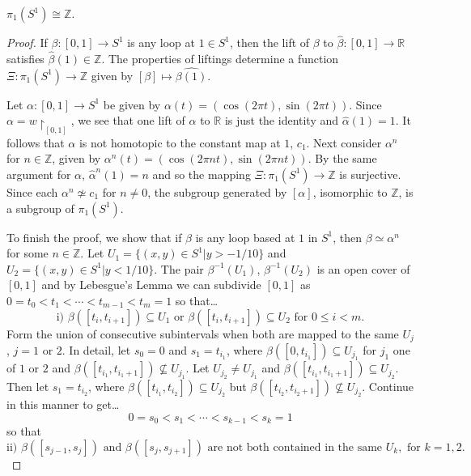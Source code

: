 \begin{theorem}
$\pi_1(S^1) \cong \mathbb{Z}$.
\end{theorem}

\begin{proof}
If $\beta : [0,1] \rightarrow S^1$ is any loop at $1 \in S^1$, then the lift
of $\beta$ to $\hat{\beta} : [0,1] \rightarrow \mathbb{R}$ satisfies $\hat{\beta}(1) \in \mathbb{Z}$. The properties of liftings
determine a function $\Xi : \pi_1(S^1) \rightarrow \mathbb{Z}$ given by $[\beta] \mapsto \hat{\beta(1)}$.

Let $\alpha : [0,1] \rightarrow S^1$ be given by $\alpha(t) = (\cos(2 \pi t), \sin(2 \pi t)).$ Since
$\alpha = w \upharpoonright_{[0,1]}$, we see that one lift of $\alpha$ to $\mathbb{R}$ is just the identity and $\hat{\alpha}(1) = 1$.
It follows that $\alpha$ is not homotopic to the constant map at $1$, $c_1$. Next consider $\alpha^n$ for $n \in \mathbb{Z}$, given by $\alpha^n(t) = (\cos(2 \pi n t), \sin(2 \pi n t))$.
By the same argument for $\alpha$, $\hat{\alpha}^n(1) = n$ and so the mapping $\Xi : \pi_1(S^1) \rightarrow \mathbb{Z}$ is surjective.
Since each $\alpha^n \not \simeq c_1$ for $n \neq 0$, the subgroup generated by $[\alpha]$, isomorphic to $\mathbb{Z}$, is a subgroup of $\pi_1(S^1)$.

To finish the proof, we show that if $\beta$ is any loop based at $1$ in $S^1$, then $\beta \simeq \alpha^n$ for some $n \in \mathbb{Z}$.
Let $U_1 = \{ (x,y) \in S^1 | y > -1/10 \}$ and $U_2 = \{(x,y) \in S^1 | y < 1/10 \}$. The pair $\beta^{-1}(U_1)$, $\beta^{-1}(U_2)$ is an
open cover of $[0,1]$ and by Lebesgue's Lemma we can subdivide $[0,1]$ as $0 = t_0 < t_1 < \cdots < t_{m-1} < t_m = 1$ so that\dots
$$\textrm{i) } \beta([t_i,t_{i+1}]) \subseteq U_1 \textrm{ or } \beta([t_i, t_{i+1}]) \subseteq U_2 \textrm{ for } 0 \leq i < m.$$
Form the union of consecutive subintervals when both are mapped to the same $U_j$, $j=1$ or $2$. In detail, let $s_0 = 0$ and $s_1 = t_{i_1}$,
where $\beta([0,t_{i_1}]) \subseteq U_{j_1}$ for $j_1$ one of $1$ or $2$ and $\beta([t_{i_1},t_{i_1 + 1}]) \not \subseteq U_{j_1}$.
Let $U_{j_2} \neq U_{j_1}$ and $\beta([t_{i_1},t_{i_1 + 1}]) \subseteq U_{j_2}$. Then let $s_1 = t_{i_2}$, where
$\beta([t_{i_1}, t_{i_2}]) \subseteq U_{j_2}$ but $\beta([t_{i_2}, t_{i_2 + 1}]) \not \subseteq U_{j_2}$. Continue in this manner to get\dots
$$0 = s_0 < s_1 < \cdots < s_{k-1} < s_k = 1$$
so that
$$\textrm{ii) } \beta([s_{j-1}, s_j]) \textrm{ and } \beta([s_j,s_{j+1}]) \textrm{ are not both contained in the same } U_k, \textrm{ for } k = 1,2.$$


\end{proof}
